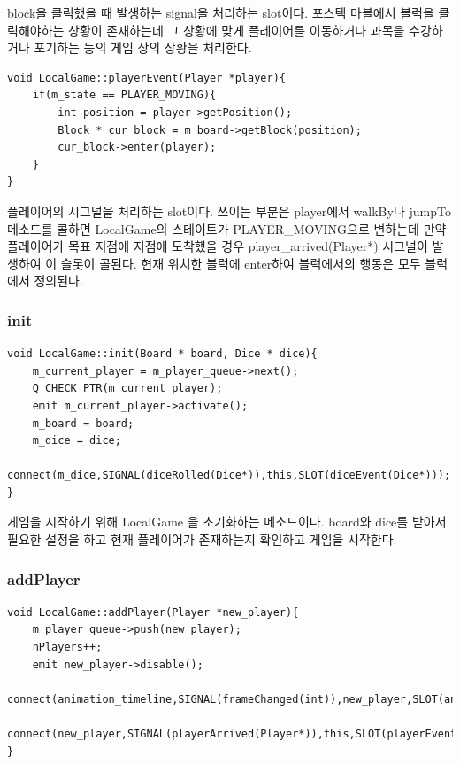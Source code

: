 \documentclass[10pt,oneside,a4paper,titlepage]{article}
\begin{document}
block을 클릭했을 때 발생하는 signal을 처리하는 slot이다. 포스텍 마블에서 블럭을 클릭해야하는 상황이 존재하는데 그 상황에 맞게 플레이어를 이동하거나 과목을 수강하거나 포기하는 등의 게임 상의 상황을 처리한다. \\

\begin{lstlisting}[frame=single,caption=
{LocalGame playerEvent},label=code:FD,captionpos=b,framexleftmargin=10pt,escapeinside=~~]
void LocalGame::playerEvent(Player *player){
    if(m_state == PLAYER_MOVING){
        int position = player->getPosition();
        Block * cur_block = m_board->getBlock(position);
        cur_block->enter(player);
    }
}
\end{lstlisting}

플레이어의 시그널을 처리하는 slot이다. 쓰이는 부분은 player에서 walkBy나 jumpTo메소드를 콜하면 LocalGame의 스테이트가 PLAYER\_MOVING으로 변하는데 만약 플레이어가 목표 지점에 지점에 도착했을 경우 player\_arrived(Player*) 시그널이 발생하여 이 슬롯이 콜된다. 현재 위치한 블럭에 enter하여 블럭에서의 행동은 모두 블럭에서 정의된다. 

\subsubsection{init}

\begin{lstlisting}[frame=single,caption=
{LocalGame init},label=code:FD,captionpos=b,framexleftmargin=10pt,escapeinside=~~]
void LocalGame::init(Board * board, Dice * dice){
    m_current_player = m_player_queue->next();
    Q_CHECK_PTR(m_current_player);
    emit m_current_player->activate();
    m_board = board;
    m_dice = dice;
    connect(m_dice,SIGNAL(diceRolled(Dice*)),this,SLOT(diceEvent(Dice*)));
}
\end{lstlisting}

게임을 시작하기 위해 LocalGame 을 초기화하는 메소드이다. board와 dice를 받아서 필요한 설정을 하고 현재 플레이어가 존재하는지 확인하고 게임을 시작한다. 

\subsubsection{addPlayer}

\begin{lstlisting}[frame=single,caption=
{LocalGame addPlayer},label=code:FD,captionpos=b,framexleftmargin=10pt,escapeinside=~~]
void LocalGame::addPlayer(Player *new_player){
    m_player_queue->push(new_player);
    nPlayers++;
    emit new_player->disable();
    connect(animation_timeline,SIGNAL(frameChanged(int)),new_player,SLOT(animatePlayerImage(int)));
    connect(new_player,SIGNAL(playerArrived(Player*)),this,SLOT(playerEvent(Player*)));
}
\end{lstlisting}
\end{document}
